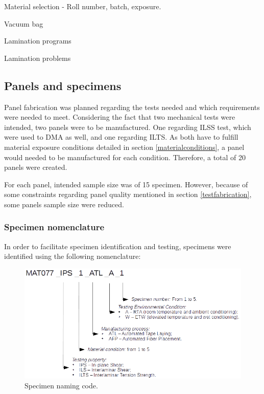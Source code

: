 Material selection - Roll number, batch, exposure.

Vacuum bag

Lamination programs

Lamination problems

\subsection{Panels and specimens}
\label{panels}

Panel fabrication was planned regarding the tests needed and which requirements were needed to meet. Considering the fact that two mechanical tests were intended, two panels were to be manufactured. One regarding ILSS test, which were used to DMA as well, and one regarding ILTS. As both have to fulfill material exposure conditions detailed in section \ref{materialconditions}, a panel would needed to be manufactured for each condition. Therefore, a total of 20 panels were created.

For each panel, intended sample size was of 15 specimen. However, because of some constraints regarding panel quality mentioned in section \ref{testfabrication}, some panels sample size were reduced. 

\subsubsection{Specimen nomenclature}
\label{nomenclature}

In order to facilitate specimen identification and testing, specimens were identified using the following nomenclature:

\begin{figure}[htbp]
\setlength{\belowcaptionskip}{-10pt}
\label{img:naming}
\includegraphics[width=\textwidth]{Chapters/Figures/naming.png}
\caption{Specimen naming code.}
\end{figure}
